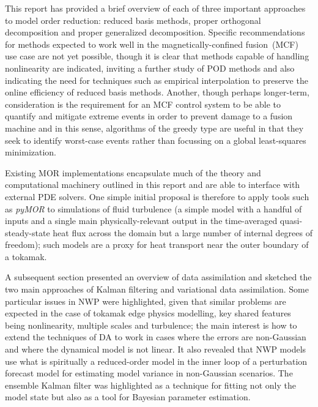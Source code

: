 This report has provided a brief overview of each of three important approaches to model order reduction: reduced basis methods, proper orthogonal decomposition and proper generalized decomposition.  
Specific recommendations for methods expected to work well in the magnetically-confined fusion~(MCF) use case are not yet possible, though it is clear that methods capable of handling nonlinearity are indicated, inviting a further study of POD methods and also indicating the need for techniques such as empirical interpolation to preserve the online efficiency of reduced basis methods.  
Another, though perhaps longer-term, consideration is the requirement for an MCF control system to be able to quantify and mitigate extreme events in order to prevent damage to a fusion machine and in this sense, algorithms of the greedy type are useful in that they seek to identify worst-case events rather than focussing on a global least-squares minimization.

Existing MOR implementations encapsulate much of the theory and computational machinery outlined in this report and are able to interface with external PDE solvers.  One simple initial proposal is therefore to apply tools such as {\it pyMOR} to simulations of fluid turbulence (a simple model with a handful of inputs and a single main physically-relevant output in the time-averaged quasi-steady-state heat flux across the domain but a large number of internal degrees of freedom); such models are a proxy for heat transport near the outer boundary of a tokamak.

A subsequent section presented an overview of data assimilation and sketched the two main approaches of Kalman filtering and variational data assimilation.  
Some particular issues in NWP were highlighted, given that similar problems are expected in the case of tokamak edge physics modelling, key shared features being nonlinearity, multiple scales and turbulence; the main interest is how to extend the techniques of DA to work in cases where the errors are non-Gaussian and where the dynamical model is not linear.  
It also revealed that NWP models use what is spiritually a reduced-order model in the inner loop of a perturbation forecast model for estimating model variance in non-Gaussian scenarios.  
The ensemble Kalman filter was highlighted as a technique for fitting not only the model state but also as a tool for Bayesian parameter estimation.
